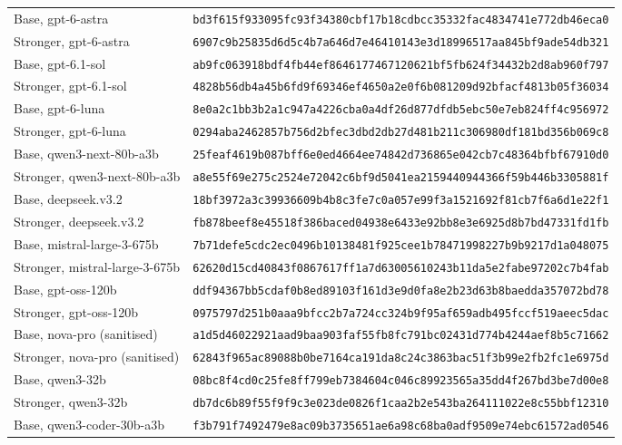 \documentclass[11pt]{article}
\begin{document}
\begin{table}[!htb]
\begin{tabularx}{\linewidth}{@{}Yl@{}}
Base, gpt-6-astra & \texttt{bd3f615f933095fc93f34380cbf17b18cdbcc35332fac4834741e772db46eca0} \\
Stronger, gpt-6-astra & \texttt{6907c9b25835d6d5c4b7a646d7e46410143e3d18996517aa845bf9ade54db321} \\
Base, gpt-6.1-sol & \texttt{ab9fc063918bdf4fb44ef8646177467120621bf5fb624f34432b2d8ab960f797} \\
Stronger, gpt-6.1-sol & \texttt{4828b56db4a45b6fd9f69346ef4650a2e0f6b081209d92bfacf4813b05f36034} \\
Base, gpt-6-luna & \texttt{8e0a2c1bb3b2a1c947a4226cba0a4df26d877dfdb5ebc50e7eb824ff4c956972} \\
Stronger, gpt-6-luna & \texttt{0294aba2462857b756d2bfec3dbd2db27d481b211c306980df181bd356b069c8} \\
Base, qwen3-next-80b-a3b & \texttt{25feaf4619b087bff6e0ed4664ee74842d736865e042cb7c48364bfbf67910d0} \\
Stronger, qwen3-next-80b-a3b & \texttt{a8e55f69e275c2524e72042c6bf9d5041ea2159440944366f59b446b3305881f} \\
Base, deepseek.v3.2 & \texttt{18bf3972a3c39936609b4b8c3fe7c0a057e99f3a1521692f81cb7f6a6d1e22f1} \\
Stronger, deepseek.v3.2 & \texttt{fb878beef8e45518f386baced04938e6433e92bb8e3e6925d8b7bd47331fd1fb} \\
Base, mistral-large-3-675b & \texttt{7b71defe5cdc2ec0496b10138481f925cee1b78471998227b9b9217d1a048075} \\
Stronger, mistral-large-3-675b & \texttt{62620d15cd40843f0867617ff1a7d63005610243b11da5e2fabe97202c7b4fab} \\
Base, gpt-oss-120b & \texttt{ddf94367bb5cdaf0b8ed89103f161d3e9d0fa8e2b23d63b8baedda357072bd78} \\
Stronger, gpt-oss-120b & \texttt{0975797d251b0aaa9bfcc2b7a724cc324b9f95af659adb495fccf519aeec5dac} \\
Base, nova-pro (sanitised) & \texttt{a1d5d46022921aad9baa903faf55fb8fc791bc02431d774b4244aef8b5c71662} \\
Stronger, nova-pro (sanitised) & \texttt{62843f965ac89088b0be7164ca191da8c24c3863bac51f3b99e2fb2fc1e6975d} \\
Base, qwen3-32b & \texttt{08bc8f4cd0c25fe8ff799eb7384604c046c89923565a35dd4f267bd3be7d00e8} \\
Stronger, qwen3-32b & \texttt{db7dc6b89f55f9f9c3e023de0826f1caa2b2e543ba264111022e8c55bbf12310} \\
Base, qwen3-coder-30b-a3b & \texttt{f3b791f7492479e8ac09b3735651ae6a98c68ba0adf9509e74ebc61572ad0546} \\

\end{tabularx}
\end{table}
\end{document}
